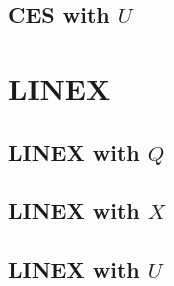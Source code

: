 \documentclass[preprint,authoryear,12pt]{elsarticle}\usepackage{graphicx, color}
\begin{document}
\subsection{CES with $U$}

\section{LINEX}

\subsection{LINEX with $Q$}

\subsection{LINEX with $X$}

\subsection{LINEX with $U$}


\end{document}
